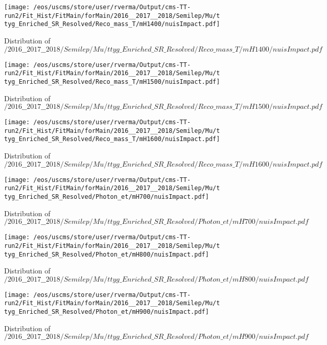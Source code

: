 \begin{figure}
\centering
\texttt{[image: /eos/uscms/store/user/rverma/Output/cms-TT-run2/Fit\_Hist/FitMain/forMain/2016\_\_2017\_\_2018/Semilep/Mu/ttyg\_Enriched\_SR\_Resolved/Reco\_mass\_T/mH1400/nuisImpact.pdf]}
\caption{Distribution of $/2016\_\_2017\_\_2018/Semilep/Mu/ttyg\_Enriched\_SR\_Resolved/Reco\_mass\_T/mH1400/nuisImpact.pdf$}
\end{figure}

\begin{figure}
\centering
\texttt{[image: /eos/uscms/store/user/rverma/Output/cms-TT-run2/Fit\_Hist/FitMain/forMain/2016\_\_2017\_\_2018/Semilep/Mu/ttyg\_Enriched\_SR\_Resolved/Reco\_mass\_T/mH1500/nuisImpact.pdf]}
\caption{Distribution of $/2016\_\_2017\_\_2018/Semilep/Mu/ttyg\_Enriched\_SR\_Resolved/Reco\_mass\_T/mH1500/nuisImpact.pdf$}
\end{figure}

\begin{figure}
\centering
\texttt{[image: /eos/uscms/store/user/rverma/Output/cms-TT-run2/Fit\_Hist/FitMain/forMain/2016\_\_2017\_\_2018/Semilep/Mu/ttyg\_Enriched\_SR\_Resolved/Reco\_mass\_T/mH1600/nuisImpact.pdf]}
\caption{Distribution of $/2016\_\_2017\_\_2018/Semilep/Mu/ttyg\_Enriched\_SR\_Resolved/Reco\_mass\_T/mH1600/nuisImpact.pdf$}
\end{figure}

\begin{figure}
\centering
\texttt{[image: /eos/uscms/store/user/rverma/Output/cms-TT-run2/Fit\_Hist/FitMain/forMain/2016\_\_2017\_\_2018/Semilep/Mu/ttyg\_Enriched\_SR\_Resolved/Photon\_et/mH700/nuisImpact.pdf]}
\caption{Distribution of $/2016\_\_2017\_\_2018/Semilep/Mu/ttyg\_Enriched\_SR\_Resolved/Photon\_et/mH700/nuisImpact.pdf$}
\end{figure}

\begin{figure}
\centering
\texttt{[image: /eos/uscms/store/user/rverma/Output/cms-TT-run2/Fit\_Hist/FitMain/forMain/2016\_\_2017\_\_2018/Semilep/Mu/ttyg\_Enriched\_SR\_Resolved/Photon\_et/mH800/nuisImpact.pdf]}
\caption{Distribution of $/2016\_\_2017\_\_2018/Semilep/Mu/ttyg\_Enriched\_SR\_Resolved/Photon\_et/mH800/nuisImpact.pdf$}
\end{figure}

\begin{figure}
\centering
\texttt{[image: /eos/uscms/store/user/rverma/Output/cms-TT-run2/Fit\_Hist/FitMain/forMain/2016\_\_2017\_\_2018/Semilep/Mu/ttyg\_Enriched\_SR\_Resolved/Photon\_et/mH900/nuisImpact.pdf]}
\caption{Distribution of $/2016\_\_2017\_\_2018/Semilep/Mu/ttyg\_Enriched\_SR\_Resolved/Photon\_et/mH900/nuisImpact.pdf$}
\end{figure}

